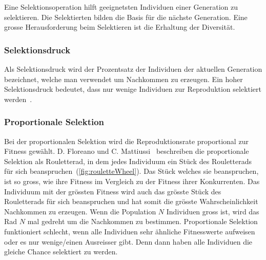       Eine Selektionsoperation hilft geeignetsten Individuen einer Generation zu selektieren.
      Die Selektierten bilden die Basis für die nächste Generation.
      Eine grosse Herausforderung beim Selektieren ist die Erhaltung der Diversität.

      \subsubsection{Selektionsdruck}

        Als Selektionsdruck wird der Prozentsatz der Individuen der aktuellen Generation bezeichnet,
        welche man verwendet um Nachkommen zu erzeugen.
        Ein hoher Selektionsdruck bedeutet,
        dass nur wenige Individuen zur Reproduktion selektiert werden~\cite[S.23]{book:bioInspired}.

      \subsubsection{Proportionale Selektion}

        Bei der proportionalen Selektion wird die Reproduktionsrate proportional zur Fitness gewählt.
        D. Floreano und C. Mattiussi~\cite[S.23]{book:bioInspired} beschreiben die proportionale Selektion als Rouletterad,
        in dem jedes Individuum ein Stück des Rouletterads für sich beanspruchen~(\vref{fig:rouletteWheel}).
        Das Stück welches sie beanspruchen, ist so gross,
        wie ihre Fitness im Vergleich zu der Fitness ihrer Konkurrenten.
        Das Individuum mit der grössten Fitness wird auch das grösste Stück des Rouletterads für sich beanspruchen und hat somit die grösste Wahrscheinlichkeit Nachkommen zu erzeugen.
        Wenn die Population \(N\) Individuen gross ist, wird das Rad \(N\) mal gedreht um die Nachkommen zu bestimmen.
        Proportionale Selektion funktioniert schlecht,
        wenn alle Individuen sehr ähnliche Fitnesswerte aufweisen oder es nur wenige/einen Ausreisser gibt.
        Denn dann haben alle Individuen die gleiche Chance selektiert zu werden.

